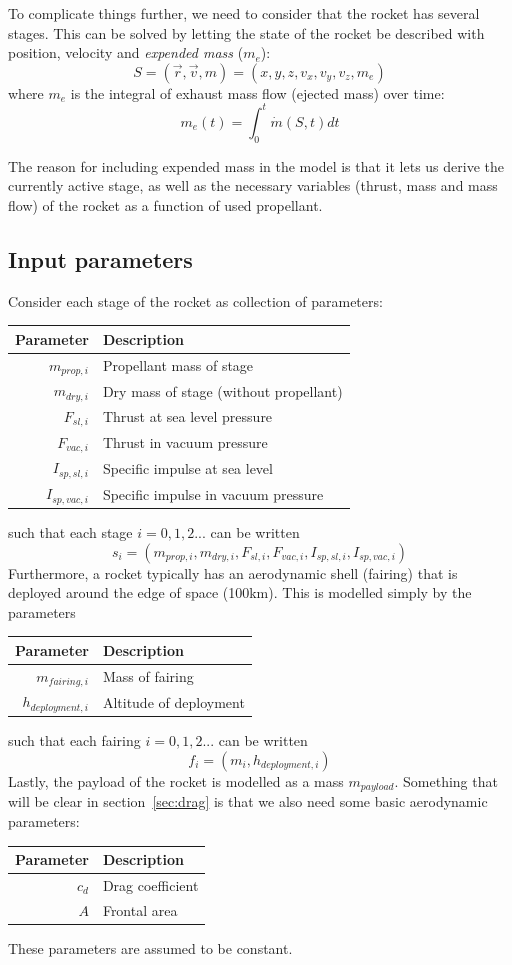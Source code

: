 \documentclass[11pt]{article}
\begin{document}
To complicate things further, we need to consider that the rocket has several stages.
This can be solved by letting the state of the rocket be described with position, velocity and \textit{expended mass} ($m_e$):
$$
S = (\vec{r}, \vec{v}, m) = (x, y, z, v_x, v_y, v_z, m_e)
$$
where $m_e$ is the integral of exhaust mass flow (ejected mass) over time:
$$
m_e(t) = \int_0^t \dot{m}(S,t) dt
$$

The reason for including expended mass in the model is that it lets us derive the currently active stage, 
as well as the necessary variables (thrust, mass and mass flow) of the rocket as a function of used propellant. 

\subsection{Input parameters} \label{sec:rocketparams}
Consider each stage of the rocket as collection of parameters:
\begin{center}
\begin{tabular}{ r  | l  }
  Parameter & Description \\
  \hline
  $m_{prop,i}$ & Propellant mass of stage \\
  $m_{dry,i}$ & Dry mass of stage (without propellant) \\
  $F_{sl,i}$ & Thrust at sea level pressure \\
  $F_{vac,i}$ & Thrust in vacuum pressure \\
  $I_{sp,sl,i}$ & Specific impulse at sea level \\
  $I_{sp,vac,i}$ & Specific impulse in vacuum pressure
\end{tabular}
\end{center}
such that each stage $i=0,1,2...$ can be written
$$
s_i = (m_{prop,i}, m_{dry,i}, F_{sl,i}, F_{vac,i}, I_{sp,sl,i}, I_{sp,vac,i})
$$
Furthermore, a rocket typically has an aerodynamic shell (fairing) that is deployed around the edge of space (100km). This is modelled simply by the parameters
\begin{center}
  \begin{tabular}{ r  | l  }
    Parameter & Description \\
    \hline
    $m_{fairing,i}$ & Mass of fairing \\
    $h_{deployment,i}$ & Altitude of deployment
  \end{tabular}
\end{center}
such that each fairing $i=0,1,2...$ can be written
$$
f_i = (m_i, h_{deployment,i})
$$
Lastly, the payload of the rocket is modelled as a mass $m_{payload}$. 
Something that will be clear in section~\ref{sec:drag} is that we also need some basic aerodynamic parameters:
\begin{center}
\begin{tabular}{ r  | l  }
  Parameter & Description \\
  \hline
  $c_d$ & Drag coefficient \\
  $A$ & Frontal area
\end{tabular}
\end{center}
These parameters are assumed to be constant.
\end{document}
